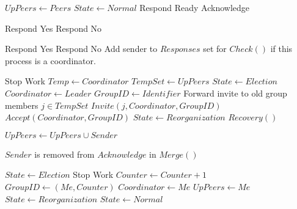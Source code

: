 \begin{algorithmic}
\State

        \State $UpPeers \gets Peers$
        \State $State \gets Normal$
        \State Respond Ready Acknowledge 
    \EndIf
\EndFunction

\State

        \State Respond Yes
    \Else
        \State Respond No
    \EndIf
\EndFunction

\State

        \State Respond Yes
    \Else
        \State Respond No
        \State Add sender to $Responses$ set for $Check()$ if this process is a coordinator.
    \EndIf
\EndFunction

\State

        \Return
    \EndIf
        \Return
    \EndIf
    \State Stop Work
    \State $Temp \gets Coordinator$
    \State $TempSet \gets UpPeers$
    \State $State \gets Election$
    \State $Coordinator \gets Leader$
    \State $GroupID \gets Identifier$
        \State Forward invite to old group members
        \For $j \in TempSet$
            \State $Invite(j,Coordinator,GroupID)$
        \EndFor
    \EndIf
    \State $Accept(Coordinator,GroupID)$
    \State $State \gets Reorganization$
        \State $Recovery()$
    \EndIf
\EndFunction

\State

        \State $UpPeers \gets UpPeers \cup {Sender}$
    \EndIf
\EndFunction

    \State $Sender$ is removed from $Acknowledge$ in $Merge()$
\EndFunction

\State

    \State $State \gets Election$
    \State Stop Work
    \State $Counter \gets Counter + 1$
    \State $GroupID \gets (Me,Counter)$
    \State $Coordinator \gets Me$
    \State $UpPeers \gets {Me}$
    \State $State \gets Reorganization$
    \State $State \gets Normal$
\EndFunction

\end{algorithmic}

